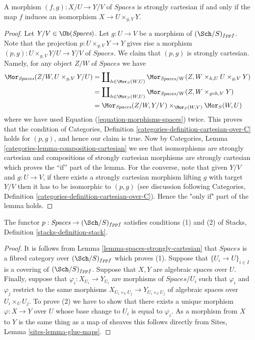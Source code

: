 \begin{lemma}
\label{lemma-spaces-strongly-cartesian}
A morphism $(f, g) : X/U \to Y/V$
of $\textit{Spaces}$ is strongly cartesian if and only if the
map $f$ induces an isomorphism $X \to U \times_{g, V} Y$.
\end{lemma}

\begin{proof}
Let $Y/V \in \Ob(\textit{Spaces})$.
Let $g : U \to V$ be a morphism of $(\Sch/S)_{fppf}$.
Note that the projection $p : U \times_{g, V} Y \to Y$
gives rise a morphism
$(p, g) : U \times_{g, V} Y/U \to Y/V$ of $\textit{Spaces}$.
We claim that $(p, g)$ is strongly cartesian.
Namely, for any object $Z/W$ of $\textit{Spaces}$ we have
\begin{align*}
\Mor_{\textit{Spaces}}(Z/W, U \times_{g, V} Y/U)
& =
\coprod\nolimits_{h \in \Mor_S(W, U)}
\Mor_{\textit{Spaces}/W}(Z, W \times_{h, U} U \times_{g, V} Y) \\
& =
\coprod\nolimits_{h \in \Mor_S(W, U)}
\Mor_{\textit{Spaces}/W}(Z, W \times_{g \circ h, V} Y) \\
& =
\Mor_{\textit{Spaces}}(Z/W, Y/V)
\times_{\Mor_S(W, V)} \Mor_S(W, U)
\end{align*}
where we have used Equation (\ref{equation-morphisms-spaces}) twice.
This proves that the condition of
Categories, Definition \ref{categories-definition-cartesian-over-C}
holds for $(p, g)$, and hence our claim is true. Now by
Categories, Lemma \ref{categories-lemma-composition-cartesian}
we see that isomorphisms are strongly cartesian and
compositions of strongly cartesian morphisms are strongly cartesian
which proves the ``if'' part of the lemma. For the converse, note
that given $Y/V$ and $g : U \to V$, if there exists a
strongly cartesian morphism lifting $g$ with target $Y/V$
then it has to be isomorphic to $(p, g)$ (see discussion following
Categories, Definition \ref{categories-definition-cartesian-over-C}).
Hence the "only if" part of the lemma holds.
\end{proof}

\begin{lemma}
\label{lemma-pre-stack-of-spaces}
The functor $p : \textit{Spaces} \to (\Sch/S)_{fppf}$
satisfies conditions (1) and (2) of
Stacks, Definition \ref{stacks-definition-stack}.
\end{lemma}

\begin{proof}
It is follows from
Lemma \ref{lemma-spaces-strongly-cartesian}
that $\textit{Spaces}$ is a fibred category over $(\Sch/S)_{fppf}$
which proves (1).
Suppose that $\{U_i \to U\}_{i \in I}$ is a covering of
$(\Sch/S)_{fppf}$. Suppose that $X, Y$ are algebraic spaces over
$U$. Finally, suppose that $\varphi_i : X_{U_i} \to Y_{U_i}$ are morphisms
of $\textit{Spaces}/U_i$ such that $\varphi_i$ and $\varphi_j$ restrict
to the same morphisms $X_{U_i \times_U U_j} \to Y_{U_i \times_U U_j}$
of algebraic spaces over $U_i \times_U U_j$.
To prove (2) we have to show that there exists a unique morphism
$\varphi  : X \to Y$ over $U$ whose base change to $U_i$ is
equal to $\varphi_i$. As a morphism from $X$ to $Y$ is the same thing
as a map of sheaves this follows directly from
Sites, Lemma \ref{sites-lemma-glue-maps}.
\end{proof}

